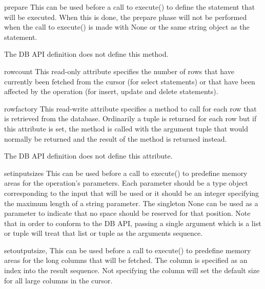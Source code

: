 \documentclass{manual}
\begin{document}
\begin{funcdesc}{prepare}{}
  This can be used before a call to execute() to define the statement that will
  be executed. When this is done, the prepare phase will not be performed when
  the call to execute() is made with None or the same string object as the
  statement.

   The DB API definition does not define this method.
\end{funcdesc}

\begin{datadesc}{rowcount}
  This read-only attribute specifies the number of rows that have currently
  been fetched from the cursor (for select statements) or that have been
  affected by the operation (for insert, update and delete statements).
\end{datadesc}

\begin{datadesc}{rowfactory}
  This read-write attribute specifies a method to call for each row that is
  retrieved from the database. Ordinarily a tuple is returned for each row but
  if this attribute is set, the method is called with the argument tuple that
  would normally be returned and the result of the method is returned instead.

   The DB API definition does not define this attribute.
\end{datadesc}

\begin{funcdesc}{setinputsizes}{}
  This can be used before a call to execute() to predefine memory areas for the
  operation's parameters. Each parameter should be a type object corresponding
  to the input that will be used or it should be an integer specifying the
  maximum length of a string parameter. The singleton None can be used as a
  parameter to indicate that no space should be reserved for that position.
  Note that in order to conform to the DB API, passing a single argument which
  is a list or tuple will treat that list or tuple as the arguments sequence.
\end{funcdesc}

\begin{funcdesc}{setoutputsize}{, }
  This can be used before a call to execute() to predefine memory areas for the
  long columns that will be fetched. The column is specified as an index into
  the result sequence. Not specifying the column will set the default size for
  all large columns in the cursor.
\end{funcdesc}
\end{document}
